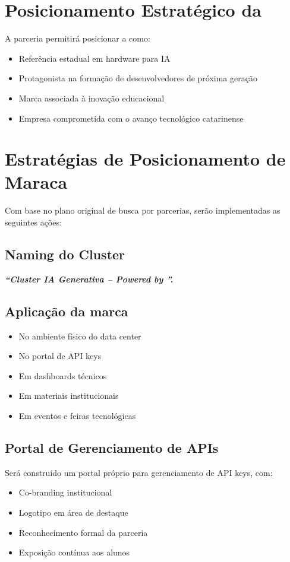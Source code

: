\documentclass[12pt,a4paper,]{abntex2}
\begin{document}
\section{Posicionamento Estratégico da \empresaParceiraAbr}
A parceria permitirá posicionar a \empresaParceiraAbr como:
\begin{itemize}
\item Referência estadual em hardware para IA
\item Protagonista na formação de desenvolvedores de próxima geração
\item Marca associada à inovação educacional
\item Empresa comprometida com o avanço tecnológico catarinense
\end{itemize}

\section{Estratégias de Posicionamento de Maraca}
Com base no plano original de busca por parcerias, serão implementadas as seguintes ações:

\subsection{Naming do Cluster}
\textbf{\textit{“Cluster IA Generativa – Powered by \empresaParceiraAbr ”.}}

\subsection{Aplicação da marca}
\begin{itemize}
\item No ambiente físico do data center
\item No portal de API keys
\item Em dashboards técnicos
\item Em materiais institucionais
\item Em eventos e feiras tecnológicas
\end{itemize}

\subsection{Portal de Gerenciamento de APIs}
Será construído um portal próprio para gerenciamento de API keys, com:
\begin{itemize}
\item Co-branding institucional
\item Logotipo em área de destaque
\item Reconhecimento formal da parceria
\item Exposição contínua aos alunos
\end{itemize}
\end{document}
